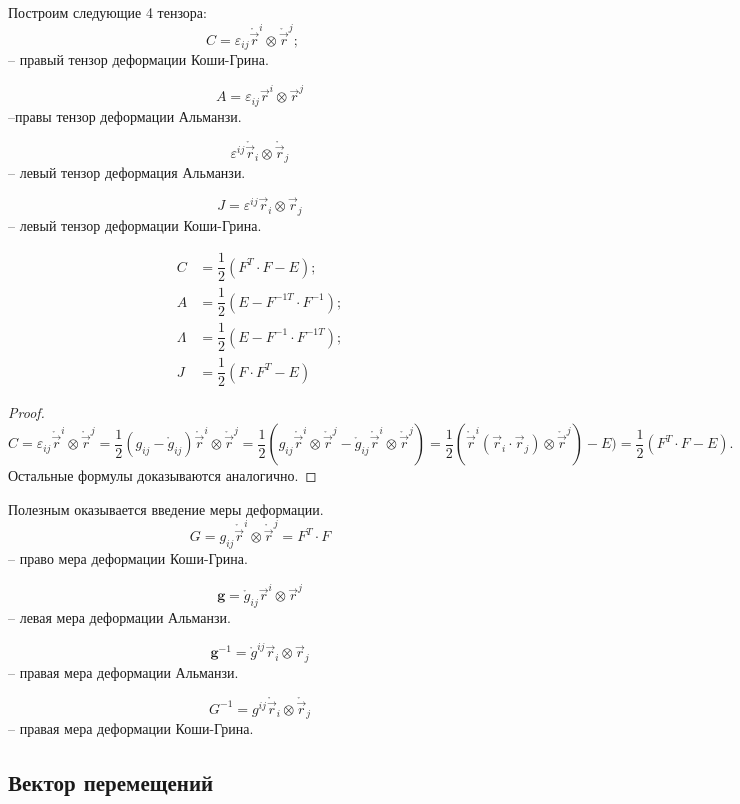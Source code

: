 Построим следующие 4 тензора:
\[
  C = \varepsilon_{ij} \mathring{\vec{r}}^i \otimes \mathring{\vec{r}}^j; \quad
\]
-- правый тензор деформации Коши-Грина.

\[
  A = \varepsilon_{ij} \vec{r}^i \otimes \vec{r}^j
\]
--правы тензор деформации Альманзи.

\[
  \varepsilon^{ij} \mathring{\vec{r}}_i \otimes \mathring{\vec{r}}_j
\]
-- левый тензор деформация Альманзи.

\[
  J = \varepsilon^{ij} \vec{r}_i \otimes \vec{r}_j
\]
-- левый тензор деформации Коши-Грина.

\begin{theorem}
  \begin{align*}
    C &= \dfrac{1}{2} (F^T \cdot F - E); \\
    A &= \dfrac{1}{2} (E - F^{-1 T} \cdot F^{-1}); \\
    \Lambda &= \dfrac{1}{2} (E - F^{-1} \cdot F^{-1 T}); \\
    J &= \dfrac{1}{2}(F \cdot F^T - E)
  \end{align*}
\end{theorem}
\begin{proof}
  \begin{equation*}
    C
    = \varepsilon_{ij} \mathring{\vec{r}}^i \otimes \mathring{\vec{r}}^j
    = \dfrac{1}{2} (g_{ij} - \mathring{g}_{ij}) \mathring{\vec{r}}^i \otimes \mathring{\vec{r}}^j
    = \dfrac{1}{2} (g_{ij} \mathring{\vec{r}}^i \otimes \mathring{\vec{r}}^j - \mathring{g}_{ij} \mathring{\vec{r}}^i \otimes \mathring{\vec{r}}^j)
    = \dfrac{1}{2} ( \mathring{\vec{r}}^i (\vec{r}_i \cdot \vec{r}_j) \otimes \mathring{\vec{r}}^j) - E)
    = \dfrac{1}{2} (F^T \cdot F - E).
  \end{equation*}
  Остальные формулы доказываются аналогично.
\end{proof}

Полезным оказывается введение меры деформации. 
\[
  G = g_{ij} \mathring{\vec{r}}^i \otimes \mathring{\vec{r}}^j = F^T \cdot F
\]
-- право мера деформации Коши-Грина.

\[
  \mathbf{g} = \mathring{g}_{ij} \vec{r}^i \otimes \vec{r}^j
\]
-- левая мера деформации Альманзи.

\[
  \mathbf{g}^{-1} = \mathring{g}^{ij} \vec{r}_i \otimes \vec{r}_j
\]
-- правая мера деформации Альманзи.

\[
  G^{-1} = g^{ij} \mathring{\vec{r}}_i \otimes \mathring{\vec{r}}_j
\]
-- правая мера деформации Коши-Грина.

\subsection{Вектор перемещений}

